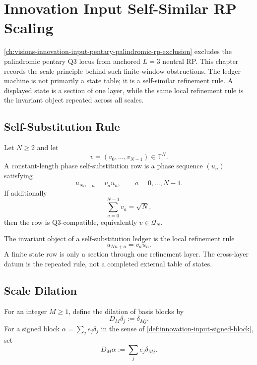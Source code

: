 \chapter{Innovation Input Self-Similar RP Scaling}
\label{ch:visions-innovation-input-self-similar-rp-scaling}

\autoref{ch:visions-innovation-input-pentary-palindromic-rp-exclusion}
excludes the palindromic pentary Q3 locus from anchored $L=3$ neutral RP.
This chapter records the scale principle behind such finite-window
obstructions. The ledger machine is not primarily a state table; it is a
self-similar refinement rule. A displayed state is a section of one layer,
while the same local refinement rule is the invariant object repeated
across all scales.

\section{Self-Substitution Rule}
\label{sec:innovation-input-self-substitution-rule}

\begin{definition}
\label{def:innovation-input-constant-length-phase-self-substitution}
Let $N\ge2$ and let
$$
v=(v_0,\ldots,v_{N-1})\in\mathbb T^N.
$$
A constant-length phase self-substitution row is a phase sequence
$(u_n)$ satisfying
$$
u_{Nn+a}=v_a u_n,
\qquad
a=0,\ldots,N-1.
$$
If additionally
$$
\sum_{a=0}^{N-1}v_a=\sqrt N,
$$
then the row is Q3-compatible, equivalently $v\in\mathcal Q_N$.
\end{definition}

\begin{principle}
\label{prin:innovation-input-rule-before-section}
The invariant object of a self-substitution ledger is the local
refinement rule
$$
u_{Nn+a}=v_a u_n.
$$
A finite state row is only a section through one refinement layer. The
cross-layer datum is the repeated rule, not a completed external table of
states.
\end{principle}

\section{Scale Dilation}
\label{sec:innovation-input-scale-dilation}

\begin{definition}
\label{def:innovation-input-block-dilation}
For an integer $M\ge1$, define the dilation of basis blocks by
$$
D_M\delta_j:=\delta_{Mj}.
$$
For a signed block $\alpha=\sum_j e_j\delta_j$ in the sense of
\autoref{def:innovation-input-signed-block}, set
$$
D_M\alpha:=\sum_j e_j\delta_{Mj}.
$$
\end{definition}


